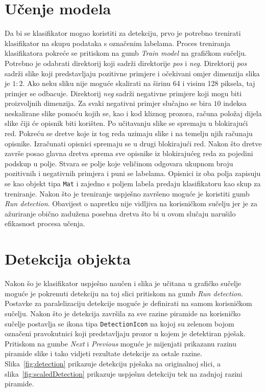 \documentclass[times, utf8, zavrsni]{fer}
\begin{document}
\section{Učenje modela}
Da bi se klasifikator mogao koristiti za detekciju, prvo je potrebno trenirati klasifikator na skupu podataka s označenim labelama. Proces treniranja klasifikatora pokreće se pritiskom na gumb \textit{Train model} na grafičkom sučelju. Potrebno je odabrati direktorij koji sadrži direktorije \textit{pos} i \textit{neg}. Direktorij \textit{pos} sadrži slike koji predstavljaju pozitivne primjere i očekivani omjer dimenzija slika je \(1 : 2\). Ako neku sliku nije moguće skalirati na širinu 64 i visinu 128 piksela, taj primjer se odbacuje. Direktorij \textit{neg} sadrži negativne primjere koji mogu biti proizvoljnih dimenzija. Za svaki negativni primjer slučajno se bira \(10\) indeksa neskalirane slike pomoću kojih se, kao i kod kliznog prozora, računa položaj dijela slike čiji će opisnik biti korišten. Po učitavanju slike se spremaju u blokirajući red. Pokreću se dretve koje iz tog reda uzimaju slike i na temelju njih računaju opisnike. Izračunati opisnici spremaju se u drugi blokirajući red. Nakon što dretve završe posao glavna dretva sprema sve opisnike iz blokirajućeg reda za pojedini podskup u polje. Stvara se polje koje veličinom odgovara ukupnom broju pozitivnih i negativnih primjera i puni se labelama. Opisnici iz oba polja zapisuju se kao objekt tipa \verb|Mat| i zajedno s poljem labela predaju klasifikatoru kao skup za treniranje. Nakon što je treniranje uspješno završeno moguće je koristiti gumb \textit{Run detection}.  Obavijest o napretku nije vidljiva na korisničkom sučelju jer je za ažuriranje obično zadužena posebna dretva što bi u ovom slučaju narušilo efikasnost procesa učenja.

\section{Detekcija objekta}
Nakon šo je klasifikator uspješno naučen i slika je učitana u grafičko sučelje moguće je pokrenuti detekciju na toj slici pritiskom na gumb \textit{Run detection}. Postavke za paralelizaciju detekcije moguće je definirati na samom korisničkom sučelju. Nakon što je detekcija završila za sve razine piramide na korisničko sučelje postavlja se ikona tipa \verb|DetectionIcon| na kojoj su zelenom bojom označeni pravokutnici koji predstavljaju prozor u kojem je detektiran pješak. Pritiskom na gumbe \textit{Next} i \textit{Previous} moguće je mijenjati prikazanu razinu piramide slike i tako vidjeti rezultate detekcije za  ostale razine. Slika~\ref{fig:detection} prikazuje detekciju pješaka na originalnoj slici, a slika~\ref{fig:scaledDetection} prikazuje uspješnu detekciju tek na zadnjoj razini piramide.
\end{document}

